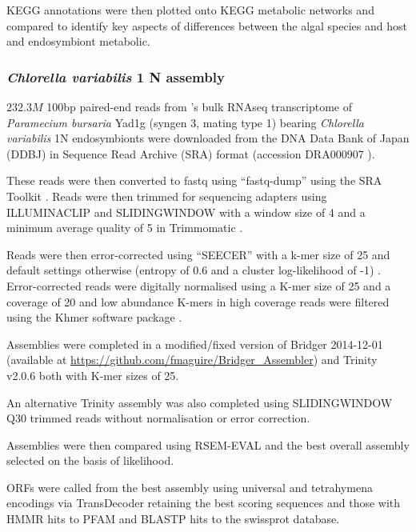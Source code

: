 {{KEGG annotations were then plotted onto KEGG metabolic networks and compared 
to identify key aspects of differences between the algal species and
host and endosymbiont metabolic.

\subsubsection{\textit{Chlorella variabilis} 1 N assembly}
\(232.3M\) 100bp paired-end reads from \citep{Kodama2014}'s 
bulk RNAseq transcriptome of \textit{Paramecium bursaria} Yad1g (syngen
3, mating type 1) bearing \textit{Chlorella variabilis} 1N endosymbionts
were downloaded from the DNA Data Bank of Japan (DDBJ) \citep{Tateno2002,Kaminuma2011}
in Sequence Read Archive (SRA) format \citep{Leinonen2011,KodamaNRA2012b} (accession DRA000907 \citep{Kodama2014}).

These reads were then converted to fastq using ``fastq-dump'' using the SRA Toolkit
\citep{NationalCenterforBiotechnologyInformation2011}.  Reads were then trimmed
for sequencing adapters using ILLUMINACLIP and SLIDINGWINDOW with a window size
of 4 and a minimum average quality of 5 in Trimmomatic \citep{Bolger2014a}.

Reads were then error-corrected using ``SEECER'' with a k-mer size of 25 and 
default settings otherwise (entropy of 0.6 and a cluster log-likelihood
of -1) \citep{Le2013}.  Error-corrected reads were digitally normalised
using a K-mer size of 25 and a coverage of 20 \citep{Brown2012} and 
low abundance K-mers in high coverage reads were filtered \citep{Zhang2014,Zhang2015}
using the Khmer software package \citep{Doring2008,Crusoe2015}.

Assemblies were completed in a modified/fixed version of 
Bridger 2014-12-01 \citep{Chang2015} (available at
\url{https://github.com/fmaguire/Bridger_Assembler}) and 
Trinity v2.0.6 \citep{Grabherr2011,Haas2013} both with K-mer
sizes of 25.

An alternative Trinity assembly was also completed using
SLIDINGWINDOW Q30 trimmed reads without normalisation or 
error correction.

Assemblies were then compared using RSEM-EVAL \citep{Li2014} and the best
overall assembly selected on the basis of likelihood.

ORFs were called from the best assembly using universal and tetrahymena encodings 
via TransDecoder \citep{Haas2013} retaining the best scoring sequences and those
with HMMR hits to PFAM and BLASTP hits to the swissprot database. 

}}
